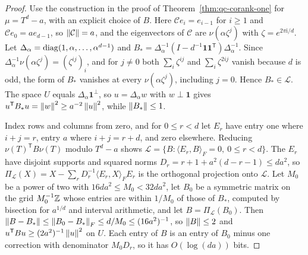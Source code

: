 \begin{proof}
Use the construction in the proof of Theorem~\ref{thm:qc-corank-one} for
$\mu=T^d-a$, with an explicit choice of $B$. Here $\mathcal Ce_i=e_{i-1}$ for
$i\ge1$ and $\mathcal Ce_0=ae_{d-1}$, so $\left\lVert\mathcal C\right\rVert=a$, and the
eigenvectors of $\mathcal C$ are $\nu(\alpha\zeta^j)$ with
$\zeta=e^{2\pi\mathrm i/d}$. Let $\Delta_\alpha=\operatorname{diag}(1,\alpha,\ldots,
\alpha^{d-1})$ and $B_*=\Delta_\alpha^{-1}(I-d^{-1}\mathbf1\mathbf1^{\mathsf
T})\Delta_\alpha^{-1}$. Since $\Delta_\alpha^{-1}\nu(\alpha\zeta^j)=
(\zeta^{ij})_i$, and for $j\ne0$ both $\sum_i\zeta^{ij}$ and $\sum_i\zeta^{2ij}$
vanish because $d$ is odd, the form of $B_*$ vanishes at every
$\nu(\alpha\zeta^j)$, including $j=0$. Hence $B_*\in\mathcal L$. The space $U$
equals $\Delta_\alpha\mathbf1^\perp$, so $u=\Delta_\alpha w$ with
$w\perp\mathbf1$ gives $u^{\mathsf T}B_*u=\left\lVert w\right\rVert^2\ge a^{-2}\left\lVert u\right\rVert^2$,
while $\left\lVert B_*\right\rVert\le1$.

Index rows and columns from zero, and for $0\le r<d$ let $E_r$ have entry one
where $i+j=r$, entry $a$ where $i+j=r+d$, and zero elsewhere. Reducing
$\nu(T)^{\mathsf T}B\nu(T)$ modulo $T^d-a$ shows
$\mathcal L=\{B:\langle E_r,B\rangle_F=0,\ 0\le r<d\}$. The $E_r$ have
disjoint supports and squared norms $D_r=r+1+a^2(d-r-1)\le da^2$, so
$\Pi_{\mathcal L}(X)=X-\sum_rD_r^{-1}\langle E_r,X\rangle_FE_r$ is the
orthogonal projection onto $\mathcal L$. Let $M_0$ be a power of two with
$16da^2\le M_0<32da^2$, let $B_0$ be a symmetric matrix on the grid
$M_0^{-1}\mathbb Z$ whose entries are within $1/M_0$ of those of $B_*$, computed by
bisection for $a^{1/d}$ and interval arithmetic, and let $B=\Pi_{\mathcal
L}(B_0)$. Then $\left\lVert B-B_*\right\rVert\le\left\lVert B_0-B_*\right\rVert_F\le d/M_0\le(16a^2)^{-1}$, so
$\left\lVert B\right\rVert\le2$ and $u^{\mathsf T}Bu\ge(2a^2)^{-1}\left\lVert u\right\rVert^2$ on $U$. Each entry
of $B$ is an entry of $B_0$ minus one correction with denominator $M_0D_r$,
so it has $O(\log(da))$ bits.


\end{proof}
